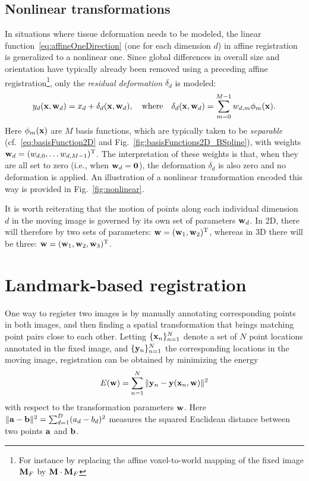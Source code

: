 \documentclass[10pt,twoside]{book}
\begin{document}
\subsection{Nonlinear transformations}

In situations where tissue deformation needs to be modeled, the linear function~\eqref{eq:affineOneDirection} (one for each dimension $d$)
in affine registration
is generalized 
to a nonlinear one.
%
Since global differences in overall size and orientation have typically already been removed using a preceding affine registration\footnote{For instance by replacing the affine voxel-to-world mapping of the fixed image $\mathbf{M}_F$ by $\mathbf{M} \cdot \mathbf{M}_F$}, only the \emph{residual deformation} 
$\delta_d$
is modeled:
\begin{equation}
y_d( \mathbf{x}, \mathbf{w}_d ) = x_d + \delta_d(\mathbf{x}, \mathbf{w}_d),
\quad
\text{where}
\quad
\delta_d(\mathbf{x}, \mathbf{w}_d) =
\sum_{m=0}^{M-1} w_{d,m} \phi_m( \mathbf{x} )
.
\label{eq:deformableOneDirection}
\end{equation}
Here $\phi_m(\mathbf{x})$ are $M$ basis functions, which are typically taken to be \emph{separable} (cf.~\eqref{eq:basisFunction2D} and Fig.~\ref{fig:basisFunctions2D_BSpline}),
with weights $\mathbf{w}_d = (w_{d,0}, \ldots w_{d,M-1})^\mathrm{T}$.
%
The interpretation of these weights is that, when they are all set to zero (i.e., when $\mathbf{w}_d = \mathbf{0}$), the deformation $\delta_d$ is also zero and no deformation is applied.
An illustration of a nonlinear transformation encoded this way is provided in Fig.~\ref{fig:nonlinear}.

%
It is worth reiterating that the motion of points along each individual dimension $d$ in the moving image is governed by its own set of parameters $\mathbf{w}_d$.
%
In 2D, there will therefore by two sets of parameters: $\mathbf{w} = (\mathbf{w}_1, \mathbf{w}_2)^\mathrm{T}$,
whereas in 3D there will be three: $\mathbf{w} = (\mathbf{w}_1, \mathbf{w}_2, \mathbf{w}_3 )^\mathrm{T}$.




\section{Landmark-based registration}

One way to register two images is by manually annotating corresponding points in both images, and then finding a spatial transformation that brings matching point pairs close to each other. Letting $\{\mathbf{x}_n\}_{n=1}^N$ denote a set of $N$ point locations annotated in the fixed image, and $\{\mathbf{y}_n\}_{n=1}^N$ the corresponding locations in the moving image, 
registration can be obtained by minimizing
the energy
$$
E(\mathbf{w}) 
=
\sum_{n=1}^N \| \mathbf{y}_n - \mathbf{y}( \mathbf{x}_n, \mathbf{w} ) \|^2
$$
with respect to the transformation parameters $\mathbf{w}$. 
Here $\| \mathbf{a} - \mathbf{b}\|^2 = \sum_{d=1}^D (a_d-b_d)^ 2$ measures the squared Euclidean distance between two points $\mathbf{a}$ and $\mathbf{b}$.
\end{document}
